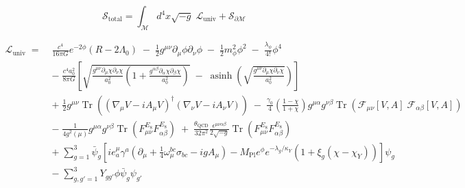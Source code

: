 \documentclass[11pt,letterpaper]{article}
\begin{document}
\vspace*{\fill}

\begin{equation*}
\mathcal{S}_{\mathrm{total}} = \int_{\mathcal{M}} d^4x \sqrt{-g} \;\mathcal{L}_{\mathrm{univ}} + \mathcal{S}_{\partial\mathcal{M}}
\end{equation*}

\vspace{1.5em}

\begin{align*}
\mathcal{L}_{\mathrm{univ}} \;=\;& \frac{c^4}{16\pi G} e^{-2\phi} \left( R - 2\Lambda_0 \right)
\;-\; \frac{1}{2} g^{\mu\nu} \partial_\mu\phi \partial_\nu\phi \;-\; \frac{1}{2} m_\phi^2 \phi^2 \;-\; \frac{\lambda_\phi}{4!} \phi^4 \\[1.2em]
&-\; \frac{c^4 a_0^2}{8\pi G} \left[ \sqrt{\frac{g^{\mu\nu}\partial_\mu\chi\partial_\nu\chi}{a_0^2}\left(1 + \frac{g^{\alpha\beta}\partial_\alpha\chi\partial_\beta\chi}{a_0^2}\right)} \;-\; \operatorname{asinh}\left(\sqrt{\frac{g^{\mu\nu}\partial_\mu\chi\partial_\nu\chi}{a_0^2}}\right) \right] \\[1.2em]
&+\; \frac{1}{2} g^{\mu\nu} \operatorname{Tr}\left( (\nabla_\mu V - i A_\mu V)^\dagger (\nabla_\nu V - i A_\nu V) \right)
\;-\; \frac{\gamma_0}{4}\left(\frac{1-\chi}{1+\chi}\right) g^{\mu\alpha} g^{\nu\beta} \operatorname{Tr}\left( \mathcal{F}_{\mu\nu}[V,A] \; \mathcal{F}_{\alpha\beta}[V,A] \right) \\[1.2em]
&-\; \frac{1}{4 g^2(\mu)} g^{\mu\alpha} g^{\nu\beta} \operatorname{Tr}\left( F_{\mu\nu}^{E_8} F_{\alpha\beta}^{E_8} \right) 
\;+\; \frac{\theta_{\mathrm{QCD}}}{32\pi^2} \frac{\epsilon^{\mu\nu\alpha\beta}}{2\sqrt{-g}} \operatorname{Tr}\left( F_{\mu\nu}^{E_8} F_{\alpha\beta}^{E_8} \right) \\[1.2em]
&+\; \sum_{g=1}^3 \bar{\psi}_g \left[ i e^\mu_a \gamma^a \left( \partial_\mu + \frac{1}{4}\omega_\mu^{bc}\sigma_{bc} - i g A_\mu \right) - M_{\mathrm{Pl}} e^\phi e^{-\lambda_g/\kappa_Y} \left(1 + \xi_g(\chi - \chi_Y)\right) \right] \psi_g \\[1.2em]
&-\; \sum_{g, g'=1}^3 Y_{gg'} \phi \bar{\psi}_g \psi_{g'}
\end{align*}

\vspace{1.5em}
\end{document}

